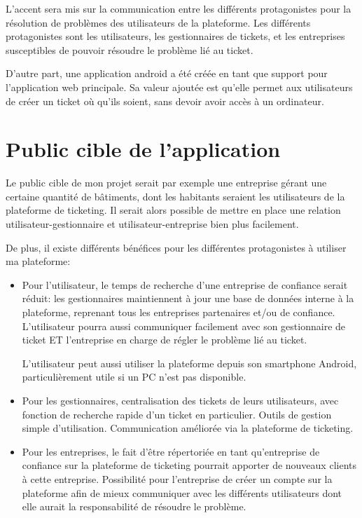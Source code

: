 \documentclass[12pt,table,a4paper]{report}
\begin{document}
L'accent sera mis sur la communication entre les différents protagonistes pour la résolution de problèmes des utilisateurs de la plateforme. Les différents protagonistes sont les utilisateurs, les gestionnaires de tickets, et les entreprises susceptibles de pouvoir résoudre le problème lié au ticket.

D'autre part, une application android a été créée en tant que support pour l'application web principale. Sa valeur ajoutée est qu'elle permet aux utilisateurs de créer un ticket où qu'ils soient, sans devoir avoir accès à un ordinateur.

\section{Public cible de l'application}
Le public cible de mon projet serait par exemple une entreprise gérant une certaine quantité de bâtiments, dont les habitants seraient les utilisateurs de la plateforme de ticketing. Il serait alors possible de mettre en place une relation utilisateur-gestionnaire et utilisateur-entreprise bien plus facilement.

De plus, il existe différents bénéfices pour les différentes protagonistes à utiliser ma plateforme:

\begin{itemize}
\item{Pour l'utilisateur, le temps de recherche d'une entreprise de confiance serait réduit: les gestionnaires maintiennent à jour une base de données interne à la plateforme, reprenant tous les entreprises partenaires et/ou de confiance. L'utilisateur pourra aussi communiquer facilement avec son gestionnaire de ticket ET l'entreprise en charge de régler le problème lié au ticket.

L'utilisateur peut aussi utiliser la plateforme depuis son smartphone Android, particulièrement utile si un PC n'est pas disponible.}
\item{Pour les gestionnaires, centralisation des tickets de leurs utilisateurs, avec fonction de recherche rapide d'un ticket en particulier. Outils de gestion simple d'utilisation. Communication améliorée via la plateforme de ticketing.}

\item{Pour les entreprises, le fait d'être répertoriée en tant qu'entreprise de confiance sur la plateforme de ticketing pourrait apporter de nouveaux clients à cette entreprise. Possibilité pour l'entreprise de créer un compte sur la plateforme afin de mieux communiquer avec les différents utilisateurs dont elle aurait la responsabilité de résoudre le problème.}
\end{itemize}
\end{document}

